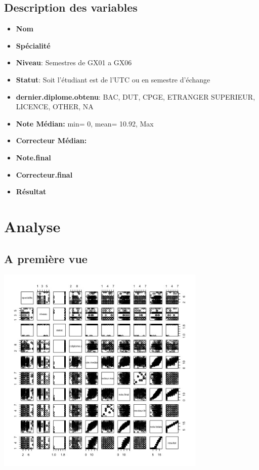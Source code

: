 \documentclass[]{report}
\begin{document}
 \subsection{Description des variables}

\begin{itemize}
	\item \textbf{Nom}
	\item \textbf{Spécialité}
	\item \textbf{Niveau}: Semestres de GX01 a GX06
	\item \textbf{Statut}: Soit l'étudiant est de l'UTC ou en semestre d'échange
	\item \textbf{dernier.diplome.obtenu}: 
	BAC, DUT, CPGE, ETRANGER SUPERIEUR, LICENCE, OTHER, NA
	\item \textbf{Note Médian:} min= 0, mean= 10.92, Max
	\item \textbf{Correcteur Médian:}
	\item \textbf{Note.final}
	\item \textbf{Correcteur.final}
	\item \textbf{Résultat}
\end{itemize}


\section{Analyse}

\subsection{A première vue}
	\begin{center}
	\includegraphics[width=100mm]{Figures/Notes/multiplot.jpg}
	\label{fig:multiplot_notes}
\end{center}
\end{document}
